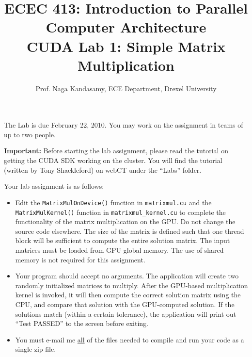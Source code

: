 \documentclass[11.5pt]{article}
\begin{document}
\newcommand{\captionfonts}{\bf}{\small}
\makeatletter  %
\long\def\@makecaption#1#2{%
  \vskip\abovecaptionskip
  \sbox\@tempboxa{{\captionfonts #1: #2}}%
  \ifdim \wd\@tempboxa >\hsize
    {\captionfonts #1: #2\par}
  \else
    \hbox to\hsize{\hfil\box\@tempboxa\hfil}%
  \fi
  \vskip\belowcaptionskip}
\makeatother   %
\renewcommand{\figurename}{Fig.} %

\title{ECEC 413: Introduction to Parallel Computer Architecture \\ CUDA Lab 1: Simple Matrix Multiplication}
\author{Prof. Naga Kandasamy, ECE Department, Drexel University}
\maketitle %
\date{}

\noindent The Lab is due February 22, 2010. You may work on the assignment in teams of up to two people.
\vspace{12pt}

\noindent \textbf{Important:} Before starting the lab assignment, please read the tutorial on getting the CUDA SDK working on the cluster. You will find the tutorial (written by Tony Shackleford) on webCT under the ``Labs'' folder. \vspace{24pt}

\noindent Your lab assignment is as follows:
\begin{itemize}
\item Edit the \texttt{MatrixMulOnDevice()} function in \texttt{matrixmul.cu} and the \texttt{MatrixMulKernel()} function in \texttt{matrixmul\_kernel.cu} to complete the functionality of the matrix multiplication on the GPU. Do not change the source code elsewhere. The size of the matrix is defined such that one thread block will be sufficient to compute the entire solution matrix. The input matrices must be loaded from GPU global memory. The use of shared memory is not required for this assignment.

\item Your program should accept no arguments. The application will create two randomly initialized matrices to multiply. After the GPU-based multiplication kernel is invoked, it will then compute the correct solution matrix using the CPU, and compare that solution with the GPU-computed solution. If the solutions match (within a certain tolerance), the application will print out ``Test PASSED'' to the screen before exiting.

\item You must e-mail me \underline{all} of the files needed to compile and run your code as a single zip file.
\end{itemize}
\vspace{12pt}
\end{document}
